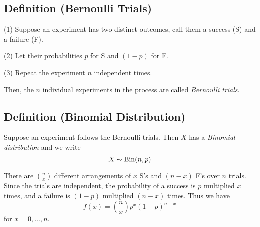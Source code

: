 \begin{defbox}
    \subsection{Definition (Bernoulli Trials)}
    (1) Suppose an experiment has two distinct outcomes, call them a success (S)
    and a failure (F).
    
    (2) Let their probabilities $ p $ for S and $ (1-p) $ for F.
    
    (3) Repeat the experiment $ n $ independent times.
    
    Then, the $ n $ individual experiments in the process are called
    \emph{Bernoulli trials}.
\end{defbox}
\begin{defbox}
    \subsection{Definition (Binomial Distribution)}
    Suppose an experiment follows the Bernoulli trials. Then $ X $ has a
    \emph{Binomial distribution} and we write
    \[ X \thicksim \operatorname{Bin}(n,p) \]
\end{defbox}


There are $ \binom{n}{x} $ different arrangements of $ x $ S's and $ (n-x) $ F's
over $ n $ trials. Since the trials are independent, the probability of a success
is $ p $ multiplied $ x $ times, and a failure is $ (1-p) $ multiplied $ (n-x) $ times.
Thus we have
\[ f(x)=\binom{n}{x}p^x(1-p)^{n-x} \]
for $ x=0,\ldots ,n $.